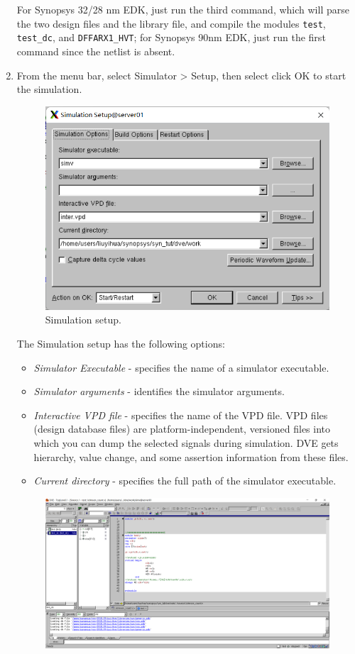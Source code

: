 \documentclass[a4paper,12pt,twoside]{article}
\begin{document}
\begin{enumerate}
    For Synopsys 32/28 nm EDK, just run the third command, which will parse the two design files and the library file, and compile the modules \texttt{test}, \texttt{test\_dc}, and \texttt{DFFARX1\_HVT}; for Synopsys 90nm EDK, just run the first command since the netlist is absent.
    \item From the menu bar, select Simulator > Setup, then select click OK to start the simulation.
    \begin{figure}[H]
        \centering
        \includegraphics[width=\textwidth]{images/27.png}
        \caption{Simulation setup.}
    \end{figure}
    The Simulation setup has the following options:
    \begin{itemize}
        \item \textit{Simulator Executable} - specifies the name of a simulator executable.
        \item \textit{Simulator arguments} - identifies the simulator arguments.
        \item \textit{Interactive VPD file} - specifies the name of the VPD file. VPD files (design database files) are platform-independent, versioned files into which you can dump the selected signals during simulation. DVE gets hierarchy, value change, and some assertion information from these files.
        \item \textit{Current directory} - specifies the full path of the simulator executable.
    \end{itemize}
    \begin{figure}[H]
        \centering
        \includegraphics[width=\textwidth]{images/28.png}

\end{figure}
\end{enumerate}
\end{document}
